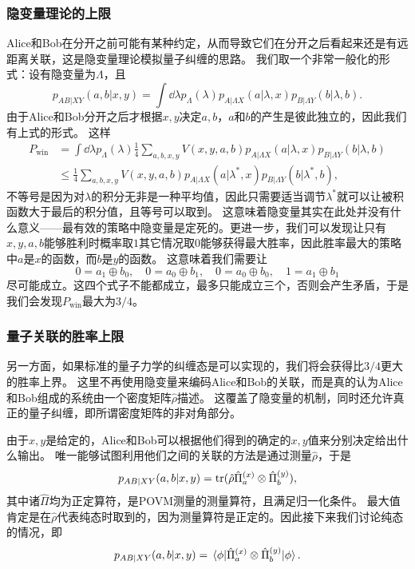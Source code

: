 \documentclass[hyperref, UTF8, a4paper]{ctexart}
\begin{document}
\subsubsection{隐变量理论的上限}

Alice和Bob在分开之前可能有某种约定，从而导致它们在分开之后看起来还是有远距离关联，这是隐变量理论模拟量子纠缠的思路。
我们取一个非常一般化的形式：设有隐变量为$\Lambda$，且
\[
    p_{AB|XY}(a, b | x, y) = \int \dd{\lambda} p_\Lambda(\lambda) p_{A|\Lambda X} (a | \lambda, x) p_{B|\Lambda Y}(b | \lambda, b).
\]
由于Alice和Bob分开之后才根据$x, y$决定$a, b$，$a$和$b$的产生是彼此独立的，因此我们有上式的形式。
这样
\[
    \begin{aligned}
        P_\text{win} &= \int \dd{\lambda} p_\Lambda(\lambda) \frac{1}{4} \sum_{a, b, x, y} V(x, y, a, b) p_{A|\Lambda X} (a | \lambda, x) p_{B|\Lambda Y}(b | \lambda, b) \\
        &\leq \frac{1}{4} \sum_{a, b, x, y} V(x, y, a, b) p_{A|\Lambda X} (a | \lambda^*, x) p_{B|\Lambda Y}(b | \lambda^*, b),
    \end{aligned}
\]
不等号是因为对$\lambda$的积分无非是一种平均值，因此只需要适当调节$\lambda^*$就可以让被积函数大于最后的积分值，且等号可以取到。
这意味着隐变量其实在此处并没有什么意义——最有效的策略中隐变量是定死的。更进一步，我们可以发现让只有$x, y, a, b$能够胜利时概率取$1$其它情况取$0$能够获得最大胜率，因此胜率最大的策略中$a$是$x$的函数，而$b$是$y$的函数。
这意味着我们需要让
\[
    0 = a_1 \oplus b_0, \quad 0 = a_0 \oplus b_1, \quad 0 = a_0 \oplus b_0, \quad 1 = a_1 \oplus b_1
\]
尽可能成立。这四个式子不能都成立，最多只能成立三个，否则会产生矛盾，于是我们会发现$P_\text{win}$最大为$3/4$。

\subsubsection{量子关联的胜率上限}

另一方面，如果标准的量子力学的纠缠态是可以实现的，我们将会获得比$3/4$更大的胜率上界。
这里不再使用隐变量来编码Alice和Bob的关联，而是真的认为Alice和Bob组成的系统由一个密度矩阵$\hat{\rho}$描述。
这覆盖了隐变量的机制，同时还允许真正的量子纠缠，即所谓密度矩阵的非对角部分。

由于$x, y$是给定的，Alice和Bob可以根据他们得到的确定的$x, y$值来分别决定给出什么输出。
唯一能够试图利用他们之间的关联的方法是通过测量$\hat{\rho}$，于是
\[
    p_{AB|XY}(a, b | x, y) = \trace (\hat{\rho} \hat{\Pi}_{a}^{(x)} \otimes \hat{\Pi}_{b}^{(y)}),
\]
其中诸$\hat{\Pi}$均为正定算符，是POVM测量的测量算符，且满足归一化条件。
最大值肯定是在$\hat{\rho}$代表纯态时取到的，因为测量算符是正定的。因此接下来我们讨论纯态的情况，即
\[
    p_{AB|XY}(a, b | x, y) = \mel{\phi}{\hat{\Pi}_{a}^{(x)} \otimes \hat{\Pi}_{b}^{(y)}}{\phi}.
\]
\end{document}
